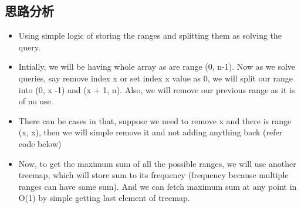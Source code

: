 \documentclass[9pt, b5paaper]{book}
\begin{document}
\subsection{思路分析}
\label{sec-6-1-1}
\begin{itemize}
\item Using simple logic of storing the ranges and splitting them as solving the query.
\item Intially, we will be having whole array as are range (0, n-1). Now as we solve queries, say remove index x or set index x value as 0, we will split our range into (0, x -1) and (x + 1, n). Also, we will remove our previous range as it is of no use.
\item There can be cases in that, suppose we need to remove x and there is range (x, x), then we will simple remove it and not adding anything back (refer code below)
\item Now, to get the maximum sum of all the possible ranges, we will use another treemap, which will store sum to its frequency (frequency because multiple ranges can have same sum). And we can fetch maximum sum at any point in O(1) by simple getting last element of treemap.
\end{itemize}
\end{document}
